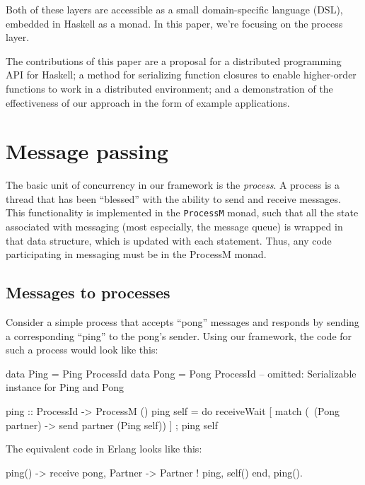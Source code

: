 \documentclass[preprint]{sigplanconf}
\begin{document}
Both of these layers are accessible as a small domain-specific language (DSL), embedded in Haskell as a monad. In this paper, we're focusing on the process layer.

The contributions of this paper are a proposal for a distributed programming API for Haskell; a method for serializing function closures to enable higher-order functions to work in a distributed environment; and a demonstration of the effectiveness of our approach in the form of example applications.

\section{Message passing}

The basic unit of concurrency in our framework is the {\em process}. A process is a thread that has been ``blessed'' with the ability to send and receive messages. This functionality is implemented in the \texttt{ProcessM} monad, such that all the state associated with messaging (most especially, the message queue) is wrapped in that data structure, which is updated with each statement. Thus, any code participating in messaging must be in the ProcessM monad.

\subsection{Messages to processes}

Consider a simple process that accepts ``pong'' messages and responds by sending a corresponding ``ping'' to the pong's sender. Using our framework, the code for such a process would look like this:

\begin{code}[caption={Ping in Haskell}]
data Ping = Ping ProcessId
data Pong = Pong ProcessId
-- omitted: Serializable instance for Ping and Pong

ping :: ProcessId -> ProcessM ()
ping self = 
   do { receiveWait [
          match (\ (Pong partner) -> 
            send partner (Ping self)) ]
      ; ping self }
\end{code}

The equivalent code in Erlang looks like this:

\begin{code}[language=Erlang,caption={Ping in Erlang}]
ping() ->
  receive
    {pong, Partner} -> 
      Partner ! {ping, self()}
  end,
  ping().               
\end{code}
\end{document}
